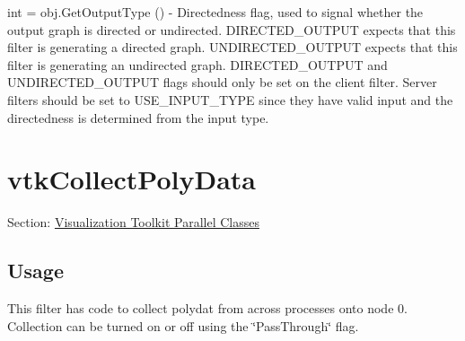 \begin{DoxyItemize}
\item {\ttfamily int = obj.\-Get\-Output\-Type ()} -\/ Directedness flag, used to signal whether the output graph is directed or undirected. D\-I\-R\-E\-C\-T\-E\-D\-\_\-\-O\-U\-T\-P\-U\-T expects that this filter is generating a directed graph. U\-N\-D\-I\-R\-E\-C\-T\-E\-D\-\_\-\-O\-U\-T\-P\-U\-T expects that this filter is generating an undirected graph. D\-I\-R\-E\-C\-T\-E\-D\-\_\-\-O\-U\-T\-P\-U\-T and U\-N\-D\-I\-R\-E\-C\-T\-E\-D\-\_\-\-O\-U\-T\-P\-U\-T flags should only be set on the client filter. Server filters should be set to U\-S\-E\-\_\-\-I\-N\-P\-U\-T\-\_\-\-T\-Y\-P\-E since they have valid input and the directedness is determined from the input type.  
\end{DoxyItemize}\hypertarget{vtkparallel_vtkcollectpolydata}{}\section{vtk\-Collect\-Poly\-Data}\label{vtkparallel_vtkcollectpolydata}
Section\-: \hyperlink{sec_vtkparallel}{Visualization Toolkit Parallel Classes} \hypertarget{vtkwidgets_vtkxyplotwidget_Usage}{}\subsection{Usage}\label{vtkwidgets_vtkxyplotwidget_Usage}
This filter has code to collect polydat from across processes onto node 0. Collection can be turned on or off using the \char`\"{}\-Pass\-Through\char`\"{} flag.

